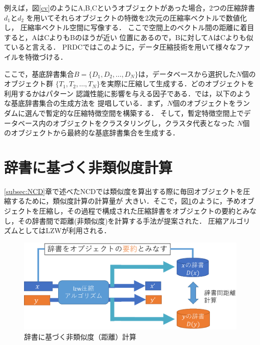 例えば，図\ref{cv}のようにA,B,Cというオブジェクトがあった場合，2つの圧縮辞書$d_1$と$d_2$
を用いてそれらオブジェクトの特徴を2次元の圧縮率ベクトルで数値化し，
圧縮率ベクトル空間に写像する．
ここで空間上のベクトル間の距離に着目すると，AはCよりもBのほうが近い
位置にあるので，Bに対してAはCよりも似ていると言える．
PRDCではこのように，データ圧縮技術を用いて様々なファイルを特徴づける．


ここで，基底辞書集合$B=\{D_1,D_2,\dots,D_N\}$は，データベースから選択した$N$個のオブジェクト群
$\{T_1,T_2,\dots,T_N\}$を実際に圧縮して生成する．どのオブジェクトを利用するかはパターン
認識性能に影響を与える因子である．\cite{PRDC}では，以下のような基底辞書集合の生成方法を
提唱している．まず，$N$個のオブジェクトをランダムに選んで暫定的な圧縮特徴空間を構築する．
そして，暫定特徴空間上でデータベース内のオブジェクトをクラスタリングし，クラスタ代表となった
$N$個のオブジェクトから最終的な基底辞書集合を生成する．


\section{辞書に基づく非類似度計算}
\ref{subsec:NCD}章で述べたNCDでは類似度を算出する際に毎回オブジェクトを圧縮するために，類似度計算の計算量が
大きい．そこで，図\ref{fig:image/Create_dictionary.eps}のように，予めオブジェクトを圧縮し，その過程で構成された圧縮辞書をオブジェクトの要約とみなし，その辞書間で距離(非類似度)を計算する手法が提案された．
圧縮アルゴリズムとしてはLZWが利用される．

\begin{figure}[tb]
\begin{center}
\includegraphics[clip, width=\columnwidth]{image/Create_dictionary.eps}
\caption{辞書に基づく非類似度（距離）計算}
\label{fig:image/Create_dictionary.eps}
\end{center}
\end{figure}



